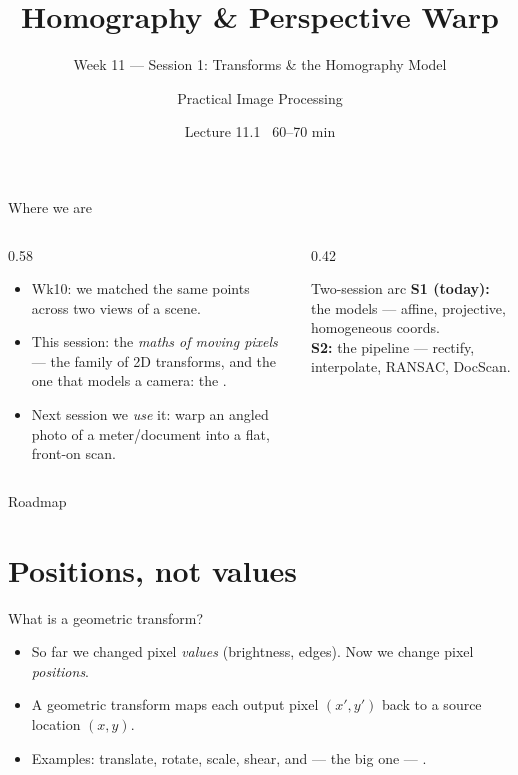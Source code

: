 \documentclass[10pt,aspectratio=169]{beamer}
\title{Homography \& Perspective Warp}
\subtitle{Week 11 — Session 1: Transforms \& the Homography Model}
\author{Practical Image Processing}
\date{Lecture 11.1 \textbullet\ 60--70 min}
\begin{document}
\maketitle

\begin{frame}{Where we are}
  \begin{columns}[T]
    \begin{column}{0.58\textwidth}
      \begin{itemize}
        \item Wk10: we matched the same points across two views of a scene.
        \item \alert{This session:} the \emph{maths of moving pixels} — the family of
              2D transforms, and the one that models a camera: the .
        \item Next session we \emph{use} it: warp an angled photo of a meter/document
              into a flat, front-on scan.
      \end{itemize}
    \end{column}
    \begin{column}{0.42\textwidth}
      \begin{alertblock}{Two-session arc}
        \textbf{S1 (today):} the models — affine, projective, homogeneous coords.\\[3pt]
        \textbf{S2:} the pipeline — rectify, interpolate, RANSAC, DocScan.
      \end{alertblock}
    \end{column}
  \end{columns}
\end{frame}

\begin{frame}{Roadmap}\tableofcontents\end{frame}

\section{Positions, not values}

\begin{frame}{What is a geometric transform?}
  \begin{itemize}
    \item So far we changed pixel \emph{values} (brightness, edges). Now we change pixel \emph{positions}.
    \item A geometric transform maps each output pixel $(x',y')$ back to a source location $(x,y)$.
    \item Examples: translate, rotate, scale, shear, and — the big one — .
  \end{itemize}
\end{frame}
\end{document}
